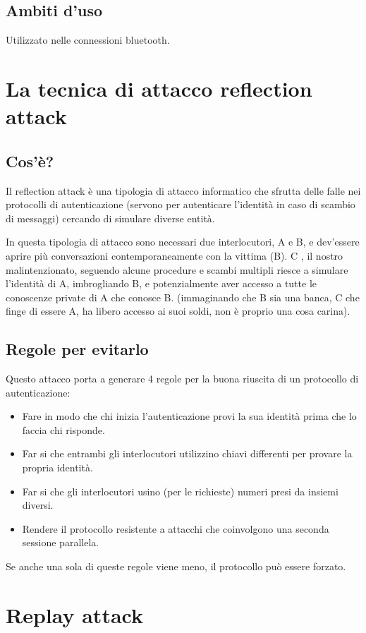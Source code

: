 \subsection{Ambiti d'uso}
Utilizzato nelle connessioni bluetooth.

\section{La tecnica di attacco reflection attack}
\subsection{Cos'è?}
Il reflection attack è una tipologia di attacco informatico che sfrutta delle falle nei protocolli di autenticazione (servono per autenticare l'identità in caso di scambio di messaggi) cercando di simulare diverse entità.

In questa tipologia di attacco sono necessari due interlocutori, A e B, e dev'essere aprire più conversazioni contemporaneamente con la vittima (B).
C , il nostro malintenzionato, seguendo alcune procedure e scambi multipli riesce a simulare l'identità di A, imbrogliando B, e potenzialmente aver accesso a tutte le conoscenze private di A che conosce B. (immaginando che B sia una banca, C che finge di essere A, ha libero accesso ai suoi soldi, non è proprio una cosa carina).
\subsection{Regole per evitarlo}
Questo attacco porta a generare 4 regole per la buona riuscita di un protocollo di autenticazione:
\begin{itemize}
\item	Fare in modo che chi inizia l'autenticazione provi la sua identità prima che lo faccia chi risponde.
\item	Far si che entrambi gli interlocutori utilizzino chiavi differenti per provare la propria identità.
\item	Far si che gli interlocutori usino (per le richieste) numeri presi da insiemi diversi.
\item	Rendere il protocollo resistente a attacchi che coinvolgono una seconda sessione parallela.
\end{itemize}
Se anche una sola di queste regole viene meno, il protocollo può essere forzato.

\section{Replay attack}
